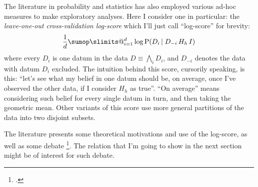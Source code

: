 \documentclass[\ifafour a4paper,12pt,\else a5paper,10pt,\fi%
onecolumn,oneside,article,%
british%
]{memoir}
\makeatletter
\theoremstyle{remark}
\theoremstyle{innote}
\def\sum{\DOTSI\sumop\slimits@}
\let\parentext=\parentexttrack%
\newcommand*{\citep}{\footcites}
\newcommand*{\citey}{\footcites}%
\newcommand*{\amp}{\&}
\newcommand*{\Land}{\bigwedge}
\newcommand*{\p}{\mathrm{P}}%
\newcommand*{\E}{\mathrm{E}}
\renewcommand*{\|}[1][]{\nonscript\,#1\vert\nonscript\;\mathopen{}}
\newcommand*{\sects}{\S\S}%
\newcommand*{\etal}{{et al.}}
\newcommand*{\yK}{I}
\makeatother
\begin{document}
The literature in probability and statistics has also employed various
 ad-hoc measures to make exploratory analyses. Here I consider one in
particular: the \emph{leave-one-out cross-validation log-score}
which I'll just call \enquote{log-score} for brevity:
\begin{equation}
  \label{eq:log-score}
  \frac{1}{d} \sum_{i=1}^{d} \log\p(D_{i} \| D_{-i} \, H_{h} \, \yK)
\end{equation}
where every $D_{i}$ is one datum in the data $D \equiv \Land_{i} D_{i}$,
and $D_{-i}$ denotes the data with datum $D_{i}$ excluded. The intuition
behind this score, cursorily speaking, is this: \enquote{let's see what my
  belief in one datum should be, on average, once I've observed the other
  data, if I consider $H_{h}$ as true}. \enquote{On average} means
considering such belief for every single datum in turn, and then taking the
geometric mean. %
Other variants of this score use more general partitions of the data into
two disjoint subsets.


The literature presents some theoretical motivations and use of the
log-score, as well as some debate \citep[\sects~3.4, 6.1.6 gives the
clearest motivation and explanation]{bernardoetal1994}[see
also][]{stone1977,geisseretal1979,vehtarietal2012,vehtarietal2002,krnjajicetal2011,krnjajicetal2014,gelmanetal2014,gronauetal2019,chandramoulietal2019}.
The relation that I'm going to show in the next section might be of
interest for such debate.



\end{document}
